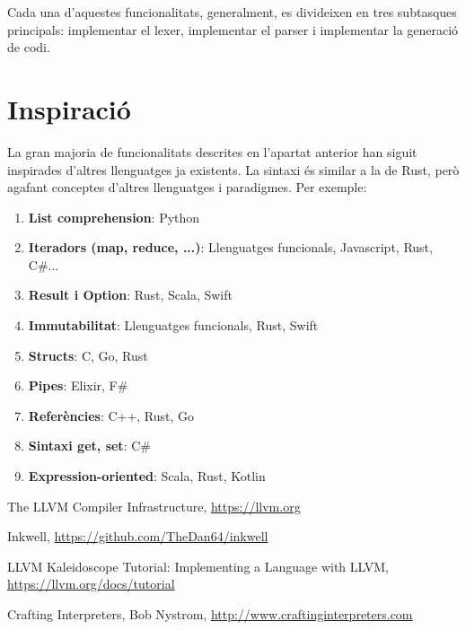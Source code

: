 ﻿\documentclass{article}
\begin{document}
Cada una d'aquestes funcionalitats, generalment, es divideixen en tres 
subtasques principals: implementar el lexer, implementar el parser i 
implementar la generació de codi.

\section{Inspiració}
La gran majoria de funcionalitats descrites en l'apartat anterior han siguit 
inspirades d'altres llenguatges ja existents. La sintaxi és similar a la de Rust,
però agafant conceptes d'altres llenguatges i paradigmes. Per exemple:

\begin{enumerate}
    \item \textbf{List comprehension}: Python
    \item \textbf{Iteradors (map, reduce, ...)}: Llenguatges funcionals, Javascript, Rust, C\#...
    \item \textbf{Result i Option}: Rust, Scala, Swift
    \item \textbf{Immutabilitat}: Llenguatges funcionals, Rust, Swift
    \item \textbf{Structs}: C, Go, Rust
    \item \textbf{Pipes}: Elixir, F\#
    \item \textbf{Referències}: C++, Rust, Go
    \item \textbf{Sintaxi get, set}: C\#
    \item \textbf{Expression-oriented}: Scala, Rust, Kotlin
\end{enumerate}

\begin{thebibliography}{9}
The LLVM Compiler Infrastructure, \url{https://llvm.org}

 Inkwell, \url{https://github.com/TheDan64/inkwell}

 LLVM Kaleidoscope Tutorial: Implementing a Language with LLVM,\\ \url{https://llvm.org/docs/tutorial}

Crafting Interpreters, Bob Nystrom, \url{http://www.craftinginterpreters.com}

\end{thebibliography}
\end{document}
